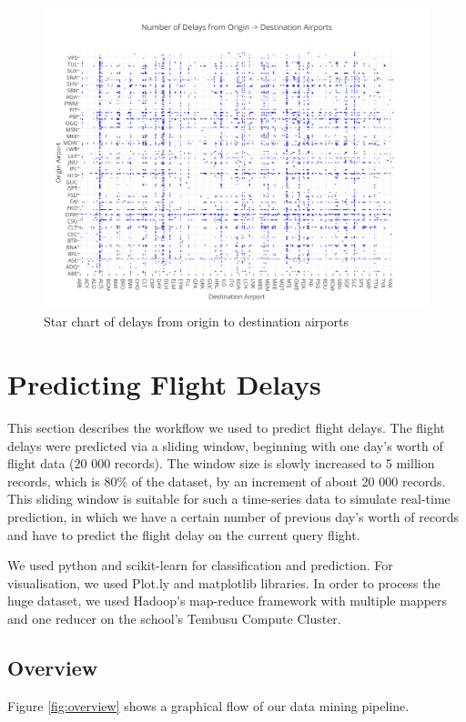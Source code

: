 \documentclass[letterpaper,11pt]{article}
\begin{document}
\begin{figure}[htb]
\centering
\includegraphics[width=1.1\linewidth]{heatmap.png}
\caption{Star chart of delays from origin to destination airports}
\label{fig:heatmap}
\end{figure}

\section{Predicting Flight Delays}
This section describes the workflow we used to predict flight delays. The flight delays were predicted via a sliding window, beginning with one day's worth of flight data (20 000 records). The window size is slowly increased to 5 million records, which is 80\% of the dataset, by an increment of about 20 000 records. This sliding window is suitable for such a time-series data to simulate real-time prediction, in which we have a certain number of previous day's worth of records and have to predict the flight delay on the current query flight. 

We used python and scikit-learn for classification and prediction. For visualisation, we used Plot.ly and matplotlib libraries. In order to process the huge dataset, we used Hadoop's map-reduce framework with multiple mappers and one reducer on the school's Tembusu Compute Cluster. 

\subsection{Overview}
Figure \ref{fig:overview} shows a graphical flow of our data mining pipeline. 
\end{document}
